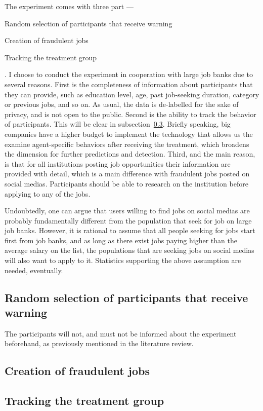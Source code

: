 The experiment comes with three part --- 
\begin{enumerate*}
    \item Random selection of participants that receive warning
    \item Creation of fraudulent jobs
    \item Tracking the treatment group
\end{enumerate*}
.
I choose to conduct the experiment in cooperation with large job banks due to several reasons. 
First is the completeness of information about participants that they can provide, 
such as education level, age, past job-seeking duration, category or previous jobs, 
and so on. 
As usual, the data is de-labelled for the sake of privacy,
and is not open to the public. 
Second is the ability to track the behavior of participants. 
This will be clear in subsection~\ref{subsec-track}. 
Briefly speaking, big companies have a higher budget to implement the technology 
that allows us the examine agent-specific behaviors after receiving the treatment, 
which broadens the dimension for further predictions and detection. 
Third, and the main reason, is that for all institutions posting job opportunities 
their information are provided with detail, 
which is a main difference with fraudulent jobs posted on social medias. 
Participants should be able to research on the institution before applying to any of the jobs. 

Undoubtedly, one can argue that users willing to find jobs on social medias  
are probably fundamentally different from the population that seek for job on large job banks. 
However, it is rational to assume that all people seeking for jobs start first from job banks, 
and as long as there exist jobs paying higher than the average salary on the list, 
the populations that are seeking jobs on social medias will also want to apply to it. 
Statistics supporting the above assumption are needed, eventually. 

\subsection{Random selection of participants that receive warning}

The participants will not, 
and must not be informed about the experiment beforehand, 
as previously mentioned in the literature review.


\subsection{Creation of fraudulent jobs}

\subsection{Tracking the treatment group} \label{subsec-track}